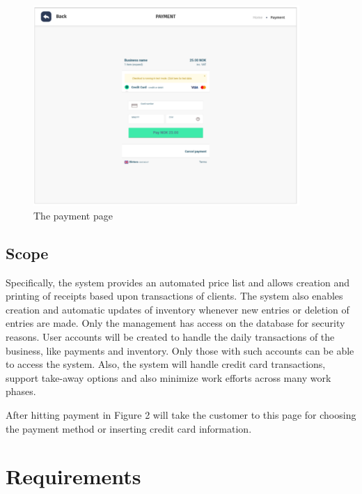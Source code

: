 \begin{figure}[H]
  \centering
  \includegraphics[width=0.9\textwidth]{./assets/t1/UI_payment.png}
  \caption{The payment page}
\end{figure}

\subsection{Scope} %
Specifically, the system provides an automated price list and allows creation and printing of receipts based upon transactions of clients.
The system also enables creation and automatic updates of inventory whenever new entries or deletion of entries are made.
Only the management has access on the database for security reasons.
User accounts will be created to handle the daily transactions of the business, like payments and inventory.
Only those with such accounts can be able to access the system.
Also, the system will handle credit card transactions, support take-away options and also minimize work efforts across many work phases.

After hitting payment in Figure 2 will take the customer to this page for choosing the payment method or inserting credit card information.

\newpage

\section{Requirements}
